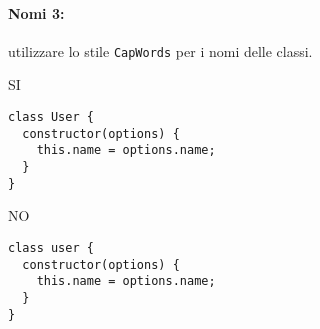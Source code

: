 \documentclass[../ProcessiPrimari.tex]{subfiles}
\begin{document}
\paragraph{Nomi 3:}utilizzare lo stile \texttt{CapWords} per i nomi delle classi.
\begin{center}{
		\begin{minipage}{6.5cm}
			{\begin{center}SI\end{center}}
			\begin{Verbatim}[frame=single]
class User {
  constructor(options) {
    this.name = options.name;
  }
}
			\end{Verbatim}
		\end{minipage}
		\hfil
		\begin{minipage}{6.5cm}
			{\begin{center}NO\end{center}}
			\begin{Verbatim}[frame=single]
class user {
  constructor(options) {
    this.name = options.name;
  }
}
			\end{Verbatim}
		\end{minipage}
	}
\end{center}
\end{document}
